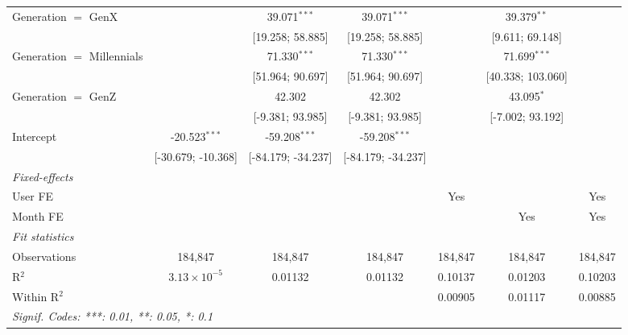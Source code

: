 \begin{table}[htbp]
\begin{threeparttable}[b]
\begin{tabular}{lcccccc}
         Generation $=$ GenX        &                       & 39.071$^{***}$     & 39.071$^{***}$     &                    & 39.379$^{**}$     &   \\   
                                    &                       & [19.258; 58.885]   & [19.258; 58.885]   &                    & [9.611; 69.148]   &   \\   
         Generation $=$ Millennials &                       & 71.330$^{***}$     & 71.330$^{***}$     &                    & 71.699$^{***}$    &   \\   
                                    &                       & [51.964; 90.697]   & [51.964; 90.697]   &                    & [40.338; 103.060] &   \\   
         Generation $=$ GenZ        &                       & 42.302             & 42.302             &                    & 43.095$^{*}$      &   \\   
                                    &                       & [-9.381; 93.985]   & [-9.381; 93.985]   &                    & [-7.002; 93.192]  &   \\   
         Intercept                  & -20.523$^{***}$       & -59.208$^{***}$    & -59.208$^{***}$    &                    &                   &   \\   
                                    & [-30.679; -10.368]    & [-84.179; -34.237] & [-84.179; -34.237] &                    &                   &   \\   
         \midrule
         \emph{Fixed-effects}\\
         User FE                    &                       &                    &                    & Yes                &                   & Yes\\  
         Month FE                   &                       &                    &                    &                    & Yes               & Yes\\  
         \midrule
         \emph{Fit statistics}\\
         Observations               & 184,847               & 184,847            & 184,847            & 184,847            & 184,847           & 184,847\\  
         R$^2$                      & $3.13\times 10^{-5}$  & 0.01132            & 0.01132            & 0.10137            & 0.01203           & 0.10203\\  
         Within R$^2$               &                       &                    &                    & 0.00905            & 0.01117           & 0.00885\\  
         \midrule \midrule
         \multicolumn{7}{l}{\emph{Signif. Codes: ***: 0.01, **: 0.05, *: 0.1}}\\
      \end{tabular}
   \end{threeparttable}
\end{table}



